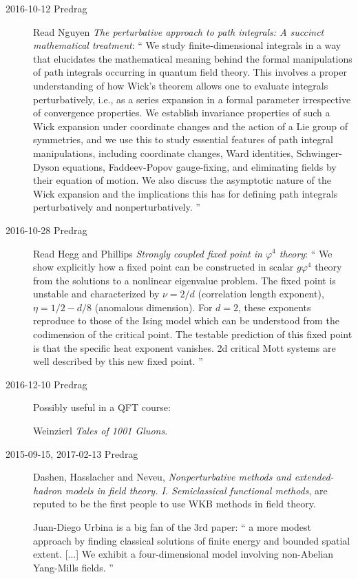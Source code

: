 \begin{description}
\item[2016-10-12 Predrag]
Read Nguyen
{\em The perturbative approach to path integrals:
{A} succinct mathematical treatment}: ``
We study finite-dimensional integrals in a way that elucidates the
mathematical meaning behind the formal manipulations of path integrals
occurring in quantum field theory. This involves a proper understanding
of how Wick's theorem allows one to evaluate integrals perturbatively,
i.e., as a series expansion in a formal parameter irrespective of
convergence properties. We establish invariance properties of such a Wick
expansion under coordinate changes and the action of a Lie group of
symmetries, and we use this to study essential features of path integral
manipulations, including coordinate changes, Ward identities,
Schwinger-Dyson equations, Faddeev-Popov gauge-fixing, and eliminating
fields by their equation of motion. We also discuss the asymptotic nature
of the Wick expansion and the implications this has for defining path
integrals perturbatively and nonperturbatively.
''

\item[2016-10-28 Predrag]
Read Hegg and Phillips
{\em Strongly coupled fixed point in {$\varphi^4$} theory}: `` We show
explicitly how a fixed point can be constructed in scalar {$g\varphi^4$}
theory from the solutions to a nonlinear eigenvalue problem. The fixed
point is unstable and characterized by {$\nu=2/d$} (correlation length
exponent), {$\eta=1/2-d/8$} (anomalous dimension). For $d=2$, these
exponents reproduce to those of the Ising model which can be understood
from the codimension of the critical point. The testable prediction of
this fixed point is that the specific heat exponent vanishes. 2d critical
Mott systems are well described by this new fixed point. ''

\item[2016-12-10 Predrag] Possibly useful in a QFT course:

Weinzierl {\em Tales of 1001 Gluons}.

\item[2015-09-15, 2017-02-13 Predrag]
Dashen, Hasslacher and Neveu,
\emph{Nonperturbative methods and extended-hadron models in field theory.
{I}. {Semiclassical} functional methods},
are reputed to be the first people to use WKB methods in field theory.


Juan-Diego Urbina is a big fan of the 3rd paper:
``
a more modest approach by finding classical
solutions of finite energy and bounded spatial extent.
[...]
We exhibit a four-dimensional model involving non-Abelian Yang-Mills fields.
''


\end{description}
